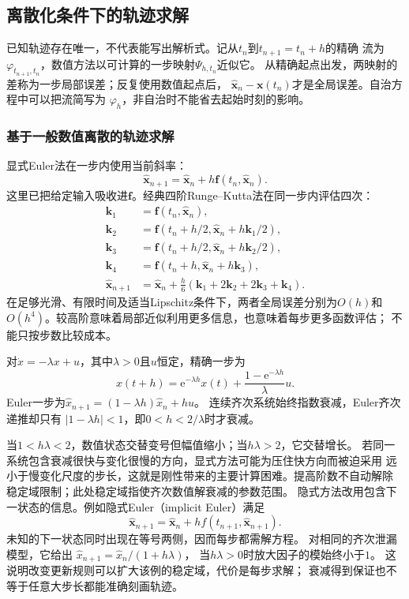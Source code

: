 \subsection{离散化条件下的轨迹求解}
\label{sec:dynamical-discretization-scan}

已知轨迹存在唯一，不代表能写出解析式。记从$t_n$到$t_{n+1}=t_n+h$的精确
流为$\varphi_{t_{n+1},t_n}$，数值方法以可计算的一步映射$\Psi_{h,t_n}$近似它。
从精确起点出发，两映射的差称为一步局部误差；反复使用数值起点后，
$\widehat{\bm x}_n-\bm x(t_n)$才是全局误差。自治方程中可以把流简写为
$\varphi_h$，非自治时不能省去起始时刻的影响。

\subsubsection{基于一般数值离散的轨迹求解}
显式Euler法在一步内使用当前斜率：
\begin{equation}
  \widehat{\bm x}_{n+1}
  =\widehat{\bm x}_n+h\bm f(t_n,\widehat{\bm x}_n).
  \label{eq:dynamical-forward-euler}
\end{equation}
这里已把给定输入吸收进$\bm f$。经典四阶Runge--Kutta法在同一步内评估四次：
\begin{align*}
  \bm k_1&=\bm f(t_n,\widehat{\bm x}_n),\\
  \bm k_2&=\bm f(t_n+h/2,\widehat{\bm x}_n+h\bm k_1/2),\\
  \bm k_3&=\bm f(t_n+h/2,\widehat{\bm x}_n+h\bm k_2/2),\\
  \bm k_4&=\bm f(t_n+h,\widehat{\bm x}_n+h\bm k_3),\\
  \widehat{\bm x}_{n+1}
    &=\widehat{\bm x}_n+\frac h6(\bm k_1+2\bm k_2+2\bm k_3+\bm k_4).
\end{align*}
在足够光滑、有限时间及适当Lipschitz条件下，两者全局误差分别为$O(h)$和
$O(h^4)$。较高阶意味着局部近似利用更多信息，也意味着每步更多函数评估；
不能只按步数比较成本。

\begin{example}[连续稳定与数值稳定不是一回事]
  \label{ex:dynamical-scalar-discretization}
  对$\dot x=-\lambda x+u$，其中$\lambda>0$且$u$恒定，精确一步为
  \[
    x(t+h)=\mathrm e^{-\lambda h}x(t)
      +\frac{1-\mathrm e^{-\lambda h}}{\lambda}u.
  \]
  Euler一步为$\widehat x_{n+1}=(1-\lambda h)\widehat x_n+hu$。
  连续齐次系统始终指数衰减，Euler齐次递推却只有
  $|1-\lambda h|<1$，即$0<h<2/\lambda$时才衰减。
\end{example}
当$1<h\lambda<2$，数值状态交替变号但幅值缩小；当$h\lambda>2$，它交替增长。
若同一系统包含衰减很快与变化很慢的方向，显式方法可能为压住快方向而被迫采用
远小于慢变化尺度的步长，这就是刚性带来的主要计算困难。提高阶数不自动解除
稳定域限制；此处稳定域指使齐次数值解衰减的参数范围。
隐式方法改用包含下一状态的信息。例如隐式Euler（implicit Euler）满足
\[
 \widehat{\bm x}_{n+1}
 =\widehat{\bm x}_n+h f(t_{n+1},\widehat{\bm x}_{n+1}).
\]
未知的下一状态同时出现在等号两侧，因而每步都需解方程。
对相同的齐次泄漏模型，它给出
$\widehat x_{n+1}=\widehat x_n/(1+h\lambda)$，
当$h\lambda>0$时放大因子的模始终小于$1$。
这说明改变更新规则可以扩大该例的稳定域，代价是每步求解；
衰减得到保证也不等于任意大步长都能准确刻画轨迹。

